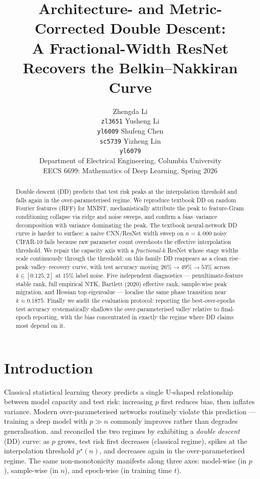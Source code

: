 \documentclass{article}
\title{Architecture- and Metric-Corrected Double Descent:\\
A Fractional-Width ResNet Recovers the Belkin--Nakkiran Curve}
\author{%
  Zhengda Li \\ \texttt{zl3651} \And
  Yusheng Li \\ \texttt{yl6009} \And
  Shufeng Chen \\ \texttt{sc5739} \And
  Yizheng Lin \\ \texttt{yl6079} \\
  \AND
  Department of Electrical Engineering, Columbia University\\
  EECS 6699: Mathematics of Deep Learning, Spring 2026
}
\begin{document}
\maketitle

\begin{abstract}
Double descent (DD) predicts that test risk peaks at the interpolation threshold and falls again in the over-parameterised regime. We reproduce textbook DD on random Fourier features (RFF) for MNIST, mechanistically attribute the peak to feature-Gram conditioning collapse via ridge and noise sweeps, and confirm a bias--variance decomposition with variance dominating the peak. The textbook neural-network DD curve is harder to surface: a naive CNN/ResNet width sweep on $n=4{,}000$ noisy CIFAR-10 fails because raw parameter count overshoots the effective interpolation threshold. We repair the capacity axis with a \emph{fractional-$k$} ResNet whose stage widths scale continuously through the threshold; on this family DD reappears as a clean rise--peak--valley--recovery curve, with test accuracy moving $26\%\!\to\!49\%\!\to\!53\%$ across $k\in[0.125,2]$ at $15\%$ label noise. Five independent diagnostics --- penultimate-feature stable rank, full empirical NTK, Bartlett (2020) effective rank, sample-wise peak migration, and Hessian top eigenvalue --- localise the same phase transition near $k\approx0.1875$. Finally we audit the evaluation protocol: reporting the best-over-epochs test accuracy systematically shallows the over-parameterised valley relative to final-epoch reporting, with the bias concentrated in exactly the regime where DD claims most depend on it.
\end{abstract}

\section{Introduction}
\label{sec:intro}

Classical statistical learning theory predicts a single U-shaped relationship between model capacity and test risk: increasing $p$ first reduces bias, then inflates variance. Modern over-parameterised networks routinely violate this prediction --- training a deep model with $p \gg n$ commonly improves rather than degrades generalisation. \citet{belkin2019reconciling} and \citet{nakkiran2021deep} reconciled the two regimes by exhibiting a \emph{double descent} (DD) curve: as $p$ grows, test risk first decreases (classical regime), spikes at the interpolation threshold $p^\star(n)$, and decreases again in the over-parameterised regime. The same non-monotonicity manifests along three axes: model-wise (in $p$), sample-wise (in $n$), and epoch-wise (in training time $t$).
\end{document}
